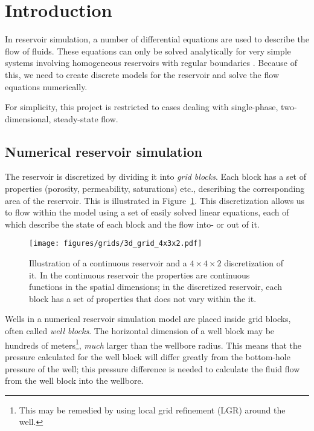 
\section{Introduction} %
\label{sec:introduction}
In reservoir simulation, a number of differential equations are used to describe the flow of fluids. These equations can only be solved analytically for very simple systems involving homogeneous reservoirs with regular boundaries \cite{Peaceman1977Fundamentals}. Because of this, we need to create discrete models for the reservoir and solve the flow equations numerically.

For simplicity, this project is restricted to cases dealing with single-phase, two-dimensional, steady-state flow.

\subsection{Numerical reservoir simulation} %
\label{sub:numerical_reservoir_simulation}


The reservoir is discretized by dividing it into \emph{grid blocks}. Each block has a set of properties (porosity, permeability, saturations) etc., describing the corresponding area of the reservoir. This is illustrated in Figure~\ref{fig:grid-discretization}. This discretization allows us to flow within the model using a set of easily solved linear equations, each of which describe the state of each block and the flow into- or out of it.

\begin{figure}[htbp]
    \centering
    \texttt{[image: figures/grids/3d\_grid\_4x3x2.pdf]}
    \caption{Illustration of a continuous reservoir and a $4\times 4\times 2$ discretization of it. In the continuous reservoir the properties are continuous functions in the spatial dimensions; in the discretized reservoir, each block has a set of properties that does not vary within the it.}
    \label{fig:grid-discretization}
\end{figure}


Wells in a numerical reservoir simulation model are placed inside grid blocks, often called \emph{well blocks}. The horizontal dimension of a well block may be hundreds of meters\footnote{This may be remedied by using local grid refinement (LGR) around the well.}, \emph{much} larger than the wellbore radius. This means that the pressure calculated for the well block will differ greatly from the bottom-hole pressure of the well; this pressure difference is needed to calculate the fluid flow  from the well block into the wellbore.

